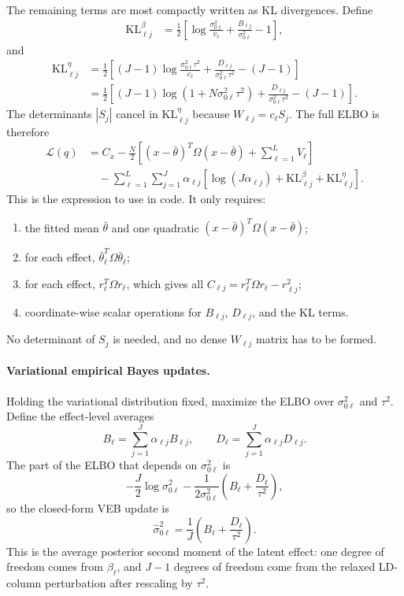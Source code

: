\documentclass[11pt]{article}
\begin{document}
The remaining terms are most compactly written as KL divergences. Define
\begin{align}
\mathrm{KL}^{\beta}_{\ell j}\label{eq:KL_beta}
&=
\frac12
\left[
\log\frac{\sigma_{0\ell}^2}{v_\ell}
+\frac{B_{\ell j}}{\sigma_{0\ell}^2}
-1
\right],
\end{align}
and
\begin{align}\label{eq:KL_eta}
\mathrm{KL}^{\eta}_{\ell j}
&=
\frac12
\left[
(J-1)\log\frac{\sigma_{0\ell}^2\tau^2}{c_\ell}
+\frac{D_{\ell j}}{\sigma_{0\ell}^2\tau^2}
-(J-1)
\right] \nonumber\\
&=
\frac12
\left[
(J-1)\log(1+N\sigma_{0\ell}^2\tau^2)
+\frac{D_{\ell j}}{\sigma_{0\ell}^2\tau^2}
-(J-1)
\right].
\end{align}
The determinants $|S_j|$ cancel in $\mathrm{KL}^{\eta}_{\ell j}$ because
$W_{\ell j}=c_\ell S_j$. The full ELBO is therefore
\begin{align}\label{eq:full-ELBO}
\mathcal L(q)
&=
C_x-\frac{N}{2}
\left[
(x-\bar\theta)^T\Omega(x-\bar\theta)
+\sum_{\ell=1}^L V_\ell
\right] \nonumber\\
&\quad
-\sum_{\ell=1}^L\sum_{j=1}^J
\alpha_{\ell j}
\left[
\log(J\alpha_{\ell j})
+\mathrm{KL}^{\beta}_{\ell j}
+\mathrm{KL}^{\eta}_{\ell j}
\right].
\end{align}
This is the expression to use in code. It only requires:
\begin{enumerate}[leftmargin=*]
\item the fitted mean $\bar\theta$ and one quadratic
$(x-\bar\theta)^T\Omega(x-\bar\theta)$;
\item for each effect, $\bar\theta_\ell^T\Omega\bar\theta_\ell$;
\item for each effect, $r_\ell^T\Omega r_\ell$, which gives all
$C_{\ell j}=r_\ell^T\Omega r_\ell-r_{\ell j}^2$;
\item coordinate-wise scalar operations for $B_{\ell j}$, $D_{\ell j}$, and the
KL terms.
\end{enumerate}
No determinant of $S_j$ is needed, and no dense $W_{\ell j}$ matrix has to be
formed.

\paragraph{Variational empirical Bayes updates.}
Holding the variational distribution fixed, maximize the ELBO over
$\sigma_{0\ell}^2$ and $\tau^2$. Define the effect-level averages
\[
B_\ell=\sum_{j=1}^J\alpha_{\ell j}B_{\ell j},
\qquad
D_\ell=\sum_{j=1}^J\alpha_{\ell j}D_{\ell j}.
\]
The part of the ELBO that depends on $\sigma_{0\ell}^2$ is
\[
-\frac{J}{2}\log\sigma_{0\ell}^2
-\frac{1}{2\sigma_{0\ell}^2}
\left(B_\ell+\frac{D_\ell}{\tau^2}\right),
\]
so the closed-form VEB update is
\[
\hat\sigma_{0\ell}^2
=
\frac{1}{J}
\left(B_\ell+\frac{D_\ell}{\tau^2}\right).
\]
This is the average posterior second moment of the latent effect: one degree of
freedom comes from $\beta_\ell$, and $J-1$ degrees of freedom come from the
relaxed LD-column perturbation after rescaling by $\tau^2$.
\end{document}

